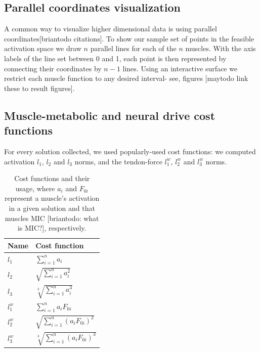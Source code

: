 \subsection{Parallel coordinates visualization}
A common way to visualize higher dimensional data is using parallel coordinates[briantodo citations]. To show our sample set of points in the feasible activation space we draw $n$ parallel lines for each of the $n$ muscles. With the axis labels of the line set between 0 and 1, each point is then represented by connecting their coordinates by $n-1$ lines. Using an interactive surface we restrict each muscle function to any desired interval- see, figures [maytodo link these to result figures].

\subsection{Muscle-metabolic and neural drive cost functions}

For every solution collected, we used popularly-used cost functions: we computed activation $l_1$, $l_2$ and $l_3$ norms, and the tendon-force $l_1^w$, $l_2^w$ and $l_3^w$ norms.


\begin{table}[h]
\centering
\begin{tabular}{@{}ll@{}}
\toprule
\textbf{Name} & \textbf{Cost function}  \\ \midrule
$l_1$            & $\sum_{i=1}^n a_i$                                     \\
$l_2$            & $\sqrt{\sum_{i=1}^n a_i^2}$                                    \\
$l_3$            & $\sqrt[3]{\sum_{i=1}^n a_i^3}$                                   \\
$l_1^w$            & $\sum_{i=1}^n a_i F_{0i}$                                    \\
$l_2^w$            & $\sqrt{\sum_{i=1}^n (a_i F_{0i})^2}$                                  \\
$l_3^w$            & $\sqrt[3]{\sum_{i=1}^n (a_i F_{0i})^3}$                                    \\ \bottomrule
\end{tabular}

\caption{Cost functions and their usage, where $a_i$ and $F_{0i}$ represent a muscle's activation in a given solution and that muscles MIC [briantodo: what is MIC?], respectively.}
\label{cost_function_tabls}

\end{table}

